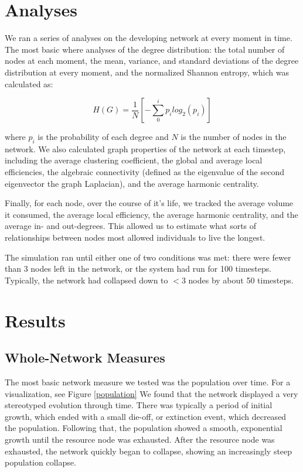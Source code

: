 \documentclass{paper}
\begin{document}
	
	\section{Analyses}
	
	We ran a series of analyses on the developing network at every moment in time. The most basic where analyses of the degree distribution: the total number of nodes at each moment, the mean, variance, and standard deviations of the degree distribution at every moment, and the normalized Shannon entropy, which was calculated as:
	
	\[ H(G) = \frac{1}{N}[-\sum_{0}^{i} p_{i}log_{2}(p_{i})] \] 
	
	where $p_{i}$ is the probability of each degree and $N$ is the number of nodes in the network. We also calculated graph properties of the network at each timestep, including the average clustering coefficient, the global and average local efficiencies, the algebraic connectivity (defined as the eigenvalue of the second eigenvector the graph Laplacian), and the average harmonic centrality.
	
	Finally, for each node, over the course of it's life, we tracked the average volume it consumed, the average local efficiency, the average harmonic centrality, and the average in- and out-degrees. This allowed us to estimate what sorts of relationships between nodes most allowed individuals to live the longest. 
	
	The simulation ran until either one of two conditions was met: there were fewer than 3 nodes left in the network, or the system had run for 100 timesteps. Typically, the network had collapsed down to $<$3 nodes by about 50 timesteps. 
	
	\section{Results}
	
	
	\subsection{Whole-Network Measures}
	The most basic network measure we tested was the population over time. For a visualization, see Figure \ref{population} We found that the network displayed a very stereotyped evolution through time. There was typically a period of initial growth, which ended with a small die-off, or extinction event, which decreased the population. Following that, the population showed a smooth, exponential growth until the resource node was exhausted. After the resource node was exhausted, the network quickly began to collapse, showing an increasingly steep population collapse. 
		
\end{document}
